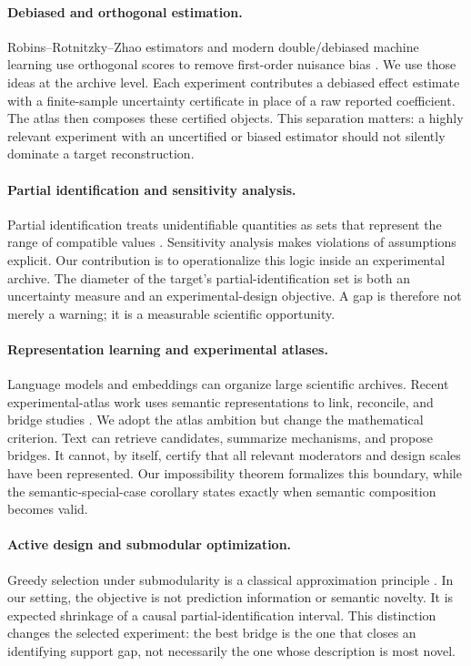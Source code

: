 \documentclass[11pt]{article}
\numberwithin{equation}{section}
\newcommand{\1}{\mathbf 1}
\begin{document}
\paragraph{Debiased and orthogonal estimation.}
Robins--Rotnitzky--Zhao estimators and modern double/debiased machine learning use orthogonal scores to remove first-order nuisance bias \citep{robins1994estimation,chernozhukov2018double}.  We use those ideas at the archive level.  Each experiment contributes a debiased effect estimate with a finite-sample uncertainty certificate in place of a raw reported coefficient.  The atlas then composes these certified objects.  This separation matters: a highly relevant experiment with an uncertified or biased estimator should not silently dominate a target reconstruction.

\paragraph{Partial identification and sensitivity analysis.}
Partial identification treats unidentifiable quantities as sets that represent the range of compatible values \citep{manski2003partial}.  Sensitivity analysis makes violations of assumptions explicit.  Our contribution is to operationalize this logic inside an experimental archive.  The diameter of the target's partial-identification set is both an uncertainty measure and an experimental-design objective.  A gap is therefore not merely a warning; it is a measurable scientific opportunity.

\paragraph{Representation learning and experimental atlases.}
Language models and embeddings can organize large scientific archives.  Recent experimental-atlas work uses semantic representations to link, reconcile, and bridge studies \citep{zhang2026atlas}.  We adopt the atlas ambition but change the mathematical criterion.  Text can retrieve candidates, summarize mechanisms, and propose bridges.  It cannot, by itself, certify that all relevant moderators and design scales have been represented.  Our impossibility theorem formalizes this boundary, while the semantic-special-case corollary states exactly when semantic composition becomes valid.

\paragraph{Active design and submodular optimization.}
Greedy selection under submodularity is a classical approximation principle \citep{nemhauser1978analysis}.  In our setting, the objective is not prediction information or semantic novelty.  It is expected shrinkage of a causal partial-identification interval.  This distinction changes the selected experiment: the best bridge is the one that closes an identifying support gap, not necessarily the one whose description is most novel.
\end{document}
